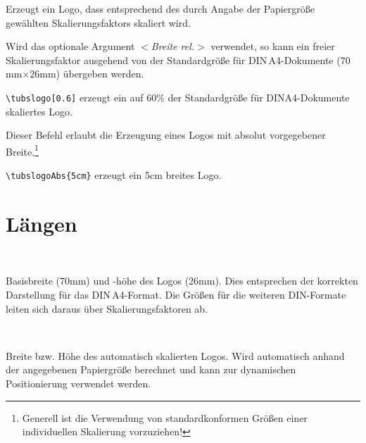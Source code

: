 \begin{Declaration}
\end{Declaration}\label{cmd:tubslogo}

Erzeugt ein Logo, dass entsprechend des durch Angabe der Papiergröße
gewählten Skalierungsfaktors skaliert wird.

Wird das optionale Argument {\sffamily\itshape $<$Breite rel.$>$}
verwendet, so kann ein freier Skalierungsfaktor ausgehend von der
Standardgröße für \mbox{DIN\,A4}-Dokumente ($70$mm$\times 26$mm) übergeben werden.

\begin{example}
\lstinline!\tubslogo[0.6]! erzeugt ein auf 60\% der 
Standardgröße für DINA4-Dokumente skaliertes Logo.
\end{example}


\begin{Declaration}
\end{Declaration}\label{cmd:tubslogoabs}
Dieser Befehl erlaubt die Erzeugung eines Logos mit absolut vorgegebener
Breite.\footnote{Generell ist die Verwendung von standardkonformen Größen
einer individuellen Skalierung vorzuziehen!}

\begin{example}
  \lstinline!\tubslogoAbs{5cm}! erzeugt ein 5cm breites Logo.
\end{example}


\section{Längen}

\begin{Declaration}
  \\
\end{Declaration}
Basisbreite (70mm) und -höhe des Logos (26mm).
Dies entsprechen der korrekten Darstellung für das \mbox{DIN\,A4}-Format.
Die Größen für die weiteren DIN-Formate leiten sich daraus über
Skalierungsfaktoren ab.

\begin{Declaration}
  \\
\end{Declaration}
Breite bzw. Höhe des automatisch skalierten Logos.
Wird automatisch anhand der angegebenen Papiergröße berechnet und
kann zur dynamischen Positionierung verwendet werden.
